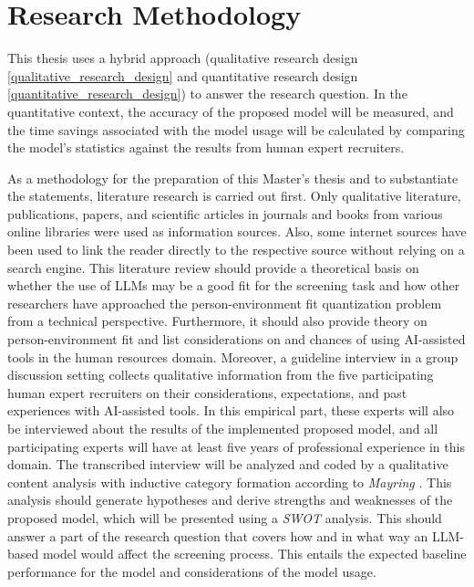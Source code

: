 \documentclass[draft,final]{thesisclass} %
\begin{document}
\section{Research Methodology} \label{research_methodology}
This thesis uses a hybrid approach (qualitative research design \ref{qualitative_research_design} and quantitative research design \ref{quantitative_research_design}) to answer the research question.
In the quantitative context, the accuracy of the proposed model will be measured, and the time savings associated with the model usage will be calculated by comparing the model's statistics against the results from human expert recruiters.

As a methodology for the preparation of this Master's thesis and to substantiate the statements, literature research is carried out first.
Only qualitative literature, publications, papers, and scientific articles in journals and books from various online libraries were used as information sources. 
Also, some internet sources have been used to link the reader directly to the respective source without relying on a search engine.
This literature review should provide a theoretical basis on whether the use of \acs{LLM}s may be a good fit for the screening task and how other researchers have approached the person-environment fit quantization problem from a technical perspective.
Furthermore, it should also provide theory on person-environment fit and list considerations on and chances of using \acs{AI}-assisted tools in the human resources domain.
Moreover, a guideline interview in a group discussion setting collects qualitative information from the five participating human expert recruiters on their considerations, expectations, and past experiences with \acs{AI}-assisted tools.
In this empirical part, these experts will also be interviewed about the results of the implemented proposed model, and all participating experts will have at least five years of professional experience in this domain.
The transcribed interview will be analyzed and coded by a qualitative content analysis with inductive category formation according to \textit{Mayring} \parencite{mayring}.
This analysis should generate hypotheses and derive strengths and weaknesses of the proposed model, which will be presented using a \textit{SWOT} analysis.
This should answer a part of the research question that covers how and in what way an \acs{LLM}-based model would affect the screening process.
This entails the expected baseline performance for the model and considerations of the model usage.
\end{document}

